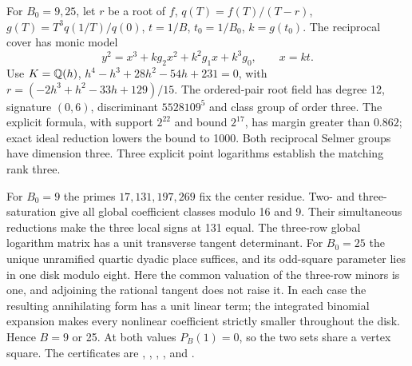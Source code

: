 For $B_0=9,25$, let $r$ be a root of $f$, $q(T)=f(T)/(T-r)$,
$g(T)=T^3q(1/T)/q(0)$, $t=1/B$, $t_0=1/B_0$, $k=g(t_0)$.
The reciprocal cover has monic model
\[
 y^2=x^3+kg_2x^2+k^2g_1x+k^3g_0,\qquad x=kt.
\]
Use $K=\mathbb Q(h)$, $h^4-h^3+28h^2-54h+231=0$, with
$r=(-2h^3+h^2-33h+129)/15$. The ordered-pair root field has degree
12, signature $(0,6)$, discriminant $5528109^5$ and class group of
order three. The explicit formula, with support $2^{22}$ and bound
$2^{17}$, has margin greater than $0.862$; exact ideal reduction lowers
the bound to 1000. Both reciprocal Selmer groups have dimension three.
Three explicit point logarithms establish the matching rank three.

For $B_0=9$ the primes $17,131,197,269$ fix the center residue.
Two- and three-saturation give all global coefficient classes modulo
16 and 9. Their simultaneous reductions make the three local signs
at 131 equal. The three-row global logarithm matrix has a unit
transverse tangent determinant. For $B_0=25$ the unique unramified
quartic dyadic place suffices, and its odd-square parameter lies in
one disk modulo eight. Here the common valuation of the three-row
minors is one, and adjoining the rational tangent does not raise it.
In each case the resulting annihilating form has a unit linear term;
the integrated binomial expansion makes every nonlinear coefficient
strictly smaller throughout the disk. Hence $B=9$ or 25. At both
values $P_B(1)=0$, so the two sets share a vertex square.
The certificates are ,
, ,
,  and
.


